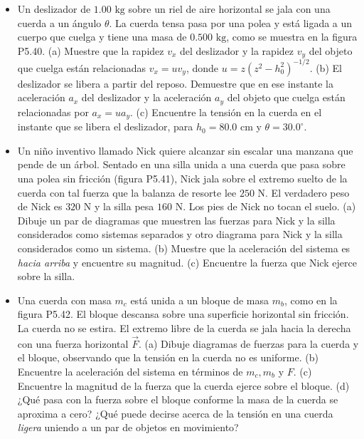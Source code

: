 \documentclass[11pt,a4paper]{article}
\begin{document}
\newpage

\begin{itemize}
    \item[\textbf{40.}] Un deslizador de $1.00 \text{ kg}$ sobre un riel de aire horizontal se jala con una cuerda a un ángulo $\theta$. La cuerda tensa pasa por una polea y está ligada a un cuerpo que cuelga y tiene una masa de $0.500 \text{ kg}$, como se muestra en la figura P5.40. (a) Muestre que la rapidez $v_x$ del deslizador y la rapidez $v_y$ del objeto que cuelga están relacionadas $v_x = u v_y$, donde $u = z(z^2 - h_0^2)^{-1/2}$. (b) El deslizador se libera a partir del reposo. Demuestre que en ese instante la aceleración $a_x$ del deslizador y la aceleración $a_y$ del objeto que cuelga están relacionadas por $a_x = u a_y$. (c) Encuentre la tensión en la cuerda en el instante que se libera el deslizador, para $h_0 = 80.0 \text{ cm}$ y $\theta = 30.0^\circ$.
    \vspace*{7cm}

    \item[\textbf{41.}] Un niño inventivo llamado Nick quiere alcanzar sin escalar una manzana que pende de un árbol. Sentado en una silla unida a una cuerda que pasa sobre una polea sin fricción (figura P5.41), Nick jala sobre el extremo suelto de la cuerda con tal fuerza que la balanza de resorte lee $250 \text{ N}$. El verdadero peso de Nick es $320 \text{ N}$ y la silla pesa $160 \text{ N}$. Los pies de Nick no tocan el suelo. (a) Dibuje un par de diagramas que muestren las fuerzas para Nick y la silla considerados como sistemas separados y otro diagrama para Nick y la silla considerados como un sistema. (b) Muestre que la aceleración del sistema es \textit{hacia arriba} y encuentre su magnitud. (c) Encuentre la fuerza que Nick ejerce sobre la silla.
    \vspace*{7cm}

    \item[\textbf{42.}] Una cuerda con masa $m_c$ está unida a un bloque de masa $m_b$, como en la figura P5.42. El bloque descansa sobre una superficie horizontal sin fricción. La cuerda no se estira. El extremo libre de la cuerda se jala hacia la derecha con una fuerza horizontal $\vec{F}$. (a) Dibuje diagramas de fuerzas para la cuerda y el bloque, observando que la tensión en la cuerda no es uniforme. (b) Encuentre la aceleración del sistema en términos de $m_c, m_b$ y $F$. (c) Encuentre la magnitud de la fuerza que la cuerda ejerce sobre el bloque. (d) ¿Qué pasa con la fuerza sobre el bloque conforme la masa de la cuerda se aproxima a cero? ¿Qué puede decirse acerca de la tensión en una cuerda \textit{ligera} uniendo a un par de objetos en movimiento?
    \vspace*{7cm}


\end{itemize}
\end{document}

